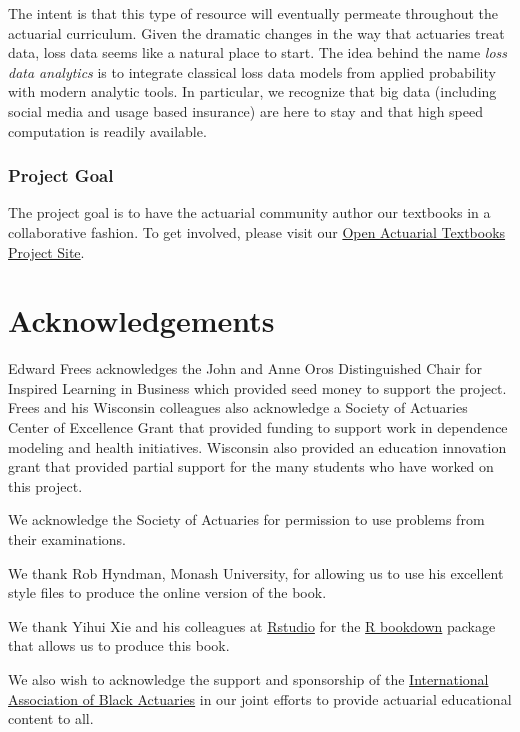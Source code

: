 \documentclass[
]{book}
\begin{document}
The intent is that this type of resource will eventually permeate throughout the actuarial curriculum. Given the dramatic changes in the way that actuaries treat data, loss data seems like a natural place to start. The idea behind the name \emph{loss data analytics} is to integrate classical loss data models from applied probability with modern analytic tools. In particular, we recognize that big data (including social media and usage based insurance) are here to stay and that high speed computation is readily available.

\hypertarget{project-goal}{%
\subsubsection*{Project Goal}\label{project-goal}}

The project goal is to have the actuarial community author our textbooks in a collaborative fashion. To get involved, please visit our
\href{https://sites.google.com/a/wisc.edu/loss-data-analytics/}{Open Actuarial Textbooks Project Site}.

\hypertarget{acknowledgements}{%
\section*{Acknowledgements}\label{acknowledgements}}

Edward Frees acknowledges the John and Anne Oros Distinguished Chair for Inspired Learning in Business which provided seed money to support the project. Frees and his Wisconsin colleagues also acknowledge a Society of Actuaries Center of Excellence Grant that provided funding to support work in dependence modeling and health initiatives. Wisconsin also provided an education innovation grant that provided partial support for the many students who have worked on this project.

We acknowledge the Society of Actuaries for permission to use problems from their examinations.

We thank Rob Hyndman, Monash University, for allowing us to use his excellent style files to produce the online version of the book.

We thank Yihui Xie and his colleagues at \href{https://www.rstudio.com/}{Rstudio} for the \href{https://bookdown.org/yihui/bookdown/}{R bookdown} package that allows us to produce this book.

We also wish to acknowledge the support and sponsorship of the \href{http://www.blackactuaries.org/}{International Association of Black Actuaries} in our joint efforts to provide actuarial educational content to all.
\end{document}
